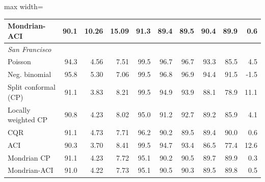 \begin{table}[!htbp]
\begin{adjustbox}{max width=\linewidth}
\begin{tabular}{lrrrrrrrrr}
Mondrian-ACI & 90.1 & 10.26 & 15.09 & 91.3 & 89.4 & 89.5 & 90.4 & 89.9 & 0.6 \\
\midrule
\multicolumn{10}{l}{\textit{San Francisco}}\\
Poisson & 94.3 & 4.56 & 7.51 & 99.5 & 96.7 & 96.7 & 93.3 & 85.5 & 4.5 \\
Neg. binomial & 95.8 & 5.30 & 7.06 & 99.5 & 96.8 & 96.9 & 94.4 & 91.5 & -1.5 \\
Split conformal (CP) & 91.1 & 3.83 & 8.21 & 99.5 & 94.9 & 93.9 & 88.1 & 78.9 & 11.1 \\
Locally weighted CP & 90.8 & 4.23 & 8.02 & 95.0 & 91.2 & 92.7 & 89.2 & 85.9 & 4.1 \\
CQR & 91.1 & 4.73 & 7.71 & 96.2 & 90.2 & 89.5 & 89.4 & 90.0 & 0.6 \\
ACI & 90.3 & 3.70 & 8.41 & 99.5 & 94.7 & 93.4 & 86.5 & 77.4 & 12.6 \\
Mondrian CP & 91.1 & 4.23 & 7.72 & 95.1 & 90.2 & 90.5 & 89.7 & 89.9 & 0.3 \\
Mondrian-ACI & 91.0 & 4.22 & 7.73 & 95.1 & 90.5 & 90.3 & 89.5 & 89.8 & 0.5 \\
\bottomrule\end{tabular}\end{adjustbox}\end{table}
